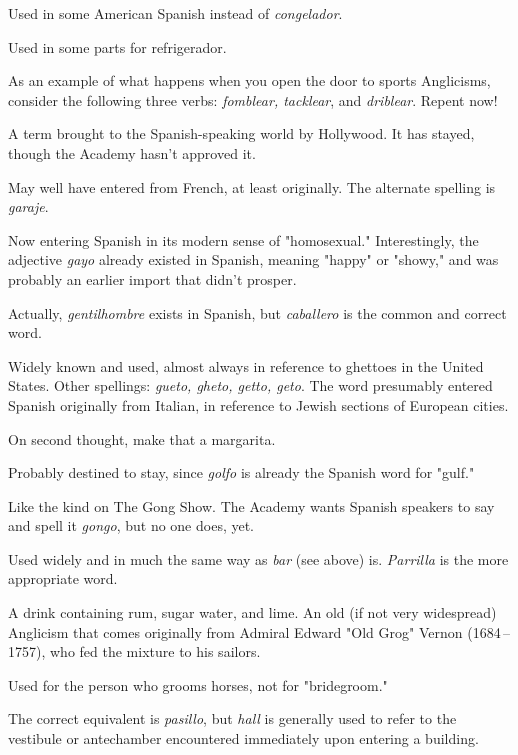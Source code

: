  Used in some American Spanish instead of
\emph{congelador}.

 Used in some parts for refrigerador.

 As an example of what happens when you open the
door to sports Anglicisms, consider the following three verbs: \emph{fomblear, tacklear}, and \emph{driblear}. Repent now!

 A term brought to the Spanish-speaking world by
Hollywood. It has stayed, though the Academy hasn't approved it.

 May well have entered from French, at least originally. The alternate spelling is \emph{garaje}.

 Now entering Spanish in its modern sense of "homosexual." Interestingly, the adjective \emph{gayo} already existed in Spanish,
meaning "happy" or "showy," and was probably an earlier import that
didn't prosper.

 Actually, \emph{gentilhombre} exists in Spanish, but
\emph{caballero} is the common and correct word.

 Widely known and used, almost always in reference
to ghettoes in the United States. Other spellings: \emph{gueto, gheto, getto,
geto}. The word presumably entered Spanish originally from Italian, in
reference to Jewish sections of European cities.

 On second thought, make that a margarita.

 Probably destined to stay, since \emph{golfo} is already the
Spanish word for "gulf."

 Like the kind on The Gong Show. The Academy
wants Spanish speakers to say and spell it \emph{gongo}, but no one does, yet.

 Used widely and in much the same way as \emph{bar} (see
above) is. \emph{Parrilla} is the more appropriate word.

 A drink containing rum, sugar water, and lime. An old
(if not very widespread) Anglicism that comes originally from Admiral
Edward "Old Grog" Vernon (1684\,--1757), who fed the mixture to his
sailors.

 Used for the person who grooms horses, not for
"bridegroom."

 The correct equivalent is \emph{pasillo}, but \emph{hall} is generally
used to refer to the vestibule or antechamber encountered immediately
upon entering a building.

